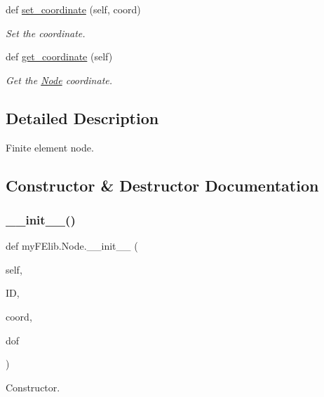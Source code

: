 \begin{DoxyCompactItemize}
def \mbox{\hyperlink{classmyFElib_1_1Node_acf4d3c7180c55968cf469f5022bbfe0e}{set\+\_\+coordinate}} (self, coord)
\begin{DoxyCompactList}\small\item\em Set the coordinate. \end{DoxyCompactList}\item 
\mbox{\label{classmyFElib_1_1Node_a47e62950678fb390be257bfe665b7790}} 
def \mbox{\hyperlink{classmyFElib_1_1Node_a47e62950678fb390be257bfe665b7790}{get\+\_\+coordinate}} (self)
\begin{DoxyCompactList}\small\item\em Get the \mbox{\hyperlink{classmyFElib_1_1Node}{Node}} coordinate. \end{DoxyCompactList}\end{DoxyCompactItemize}


\subsection{Detailed Description}
Finite element node. 

\subsection{Constructor \& Destructor Documentation}
\mbox{\label{classmyFElib_1_1Node_ad215dccab815671eb21635446c121b75}} 
\subsubsection{\texorpdfstring{\+\_\+\+\_\+init\+\_\+\+\_\+()}{\_\_init\_\_()}}
{\footnotesize\ttfamily def my\+F\+Elib.\+Node.\+\_\+\+\_\+init\+\_\+\+\_\+ (\begin{DoxyParamCaption}\item[{}]{self,  }\item[{}]{ID,  }\item[{}]{coord,  }\item[{}]{dof }\end{DoxyParamCaption})}



Constructor. 


